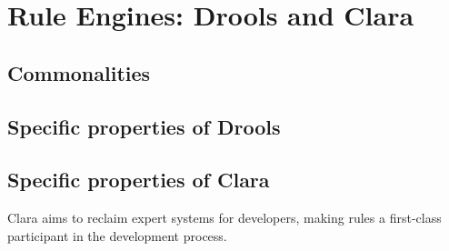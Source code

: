 \section{Rule Engines: Drools and Clara}


\subsection{Commonalities}

\subsection{Specific properties of Drools}


\subsection{Specific properties of Clara}
Clara aims to reclaim expert systems for developers, making rules a first-class participant in the development process.


